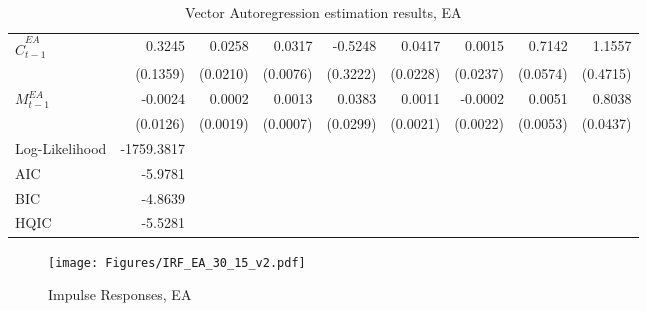 \begin{sidewaystable}
\begin{tabular}{lrrrrrrrr}
        $\hat{C}^{EA}_{t-1}$          &  0.3245 &   0.0258 &      0.0317 & -0.5248 &  0.0417 &  0.0015 &  0.7142 &    1.1557 \\
               &  (0.1359) &   (0.0210) &      (0.0076) &  (0.3222) &  (0.0228) &  (0.0237) &  (0.0574) &    (0.4715) \\
        $M^{EA}_{t-1}$      & -0.0024 &   0.0002 &      0.0013 &  0.0383 &  0.0011 & -0.0002 &  0.0051 &    0.8038 \\
           &  (0.0126) &   (0.0019) &      (0.0007) &  (0.0299) &  (0.0021) &  (0.0022) &  (0.0053) &    (0.0437) \\
    \midrule
    Log-Likelihood & -1759.3817 \\
    AIC            &    -5.9781 \\
    BIC            &    -4.8639 \\
    HQIC           &    -5.5281 \\
    \bottomrule
    \end{tabular}
    \caption{Vector Autoregression estimation results, EA}
    \label{tab:VAR_output_EA}
\end{sidewaystable}


\begin{sidewaysfigure}
    \centering
    \texttt{[image: Figures/IRF\_EA\_30\_15\_v2.pdf]}
    \caption{Impulse Responses, EA}
    \label{fig:IRF_EA}
\end{sidewaysfigure}












